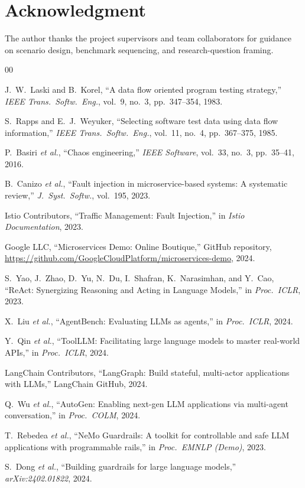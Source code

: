 \documentclass[sigconf,review,anonymous,balance=false]{acmart}
\begin{document}
\section*{Acknowledgment}

The author thanks the project supervisors and team collaborators for guidance
on scenario design, benchmark sequencing, and research-question framing.


\begin{thebibliography}{00}

J.~W.~Laski and B.~Korel, ``A data flow oriented program testing strategy,''
\textit{IEEE Trans.\ Softw.\ Eng.}, vol.~9, no.~3, pp.~347--354, 1983.

S.~Rapps and E.~J.~Weyuker, ``Selecting software test data using data flow
information,'' \textit{IEEE Trans.\ Softw.\ Eng.}, vol.~11, no.~4,
pp.~367--375, 1985.

P.~Basiri \textit{et al.}, ``Chaos engineering,''
\textit{IEEE Software}, vol.~33, no.~3, pp.~35--41, 2016.

B.~Canizo \textit{et al.}, ``Fault injection in microservice-based systems:
A systematic review,'' \textit{J.\ Syst.\ Softw.}, vol.~195, 2023.

Istio Contributors, ``Traffic Management: Fault Injection,''
in \textit{Istio Documentation}, 2023.

Google LLC, ``Microservices Demo: Online Boutique,'' GitHub repository,
\url{https://github.com/GoogleCloudPlatform/microservices-demo}, 2024.

S.~Yao, J.~Zhao, D.~Yu, N.~Du, I.~Shafran, K.~Narasimhan, and Y.~Cao,
``ReAct: Synergizing Reasoning and Acting in Language Models,''
in \textit{Proc.\ ICLR}, 2023.

X.~Liu \textit{et al.}, ``AgentBench: Evaluating LLMs as agents,''
in \textit{Proc.\ ICLR}, 2024.

Y.~Qin \textit{et al.}, ``ToolLLM: Facilitating large language models to
master real-world APIs,'' in \textit{Proc.\ ICLR}, 2024.

LangChain Contributors, ``LangGraph: Build stateful, multi-actor applications
with LLMs,'' LangChain GitHub, 2024.

Q.~Wu \textit{et al.}, ``AutoGen: Enabling next-gen LLM applications via
multi-agent conversation,'' in \textit{Proc.\ COLM}, 2024.

T.~Rebedea \textit{et al.}, ``NeMo Guardrails: A toolkit for controllable and
safe LLM applications with programmable rails,''
in \textit{Proc.\ EMNLP (Demo)}, 2023.

S.~Dong \textit{et al.}, ``Building guardrails for large language models,''
\textit{arXiv:2402.01822}, 2024.

\end{thebibliography}
\end{document}
